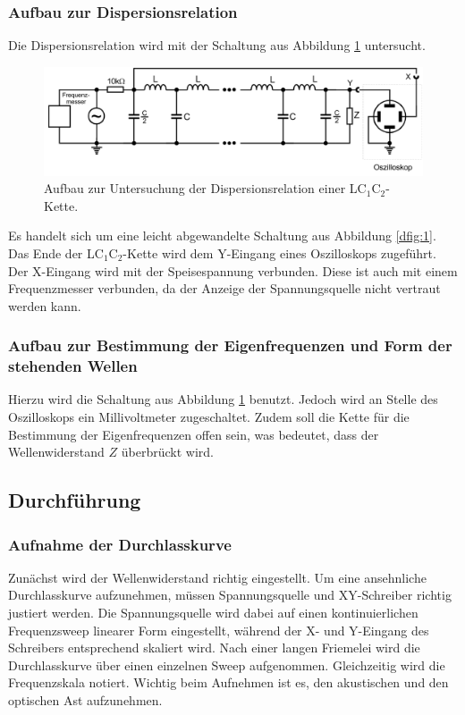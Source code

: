 \subsubsection{Aufbau zur Dispersionsrelation}
Die Dispersionsrelation wird mit der Schaltung aus Abbildung \ref{dfig:2} untersucht.

\begin{figure}[H]
  \centering
  \includegraphics{dispersion.png}
  \caption{Aufbau zur Untersuchung der Dispersionsrelation einer LC$_1$C$_2$-Kette.}
  \label{dfig:2}
\end{figure}

Es handelt sich um eine leicht abgewandelte Schaltung aus Abbildung \ref{dfig:1}.
Das Ende der LC$_1$C$_2$-Kette wird dem Y-Eingang eines Oszilloskops zugeführt.
Der X-Eingang wird mit der Speisespannung verbunden.
Diese ist auch mit einem Frequenzmesser verbunden, da der Anzeige der Spannungsquelle nicht vertraut werden kann.

\subsubsection{Aufbau zur Bestimmung der Eigenfrequenzen und Form der stehenden Wellen}
Hierzu wird die Schaltung aus Abbildung \ref{dfig:2} benutzt.
Jedoch wird an Stelle des Oszilloskops ein Millivoltmeter zugeschaltet.
Zudem soll die Kette für die Bestimmung der Eigenfrequenzen offen sein, was bedeutet, dass der Wellenwiderstand $Z$ überbrückt wird.

\subsection{Durchführung}
\subsubsection{Aufnahme der Durchlasskurve}
Zunächst wird der Wellenwiderstand richtig eingestellt.
Um eine ansehnliche Durchlasskurve aufzunehmen, müssen Spannungsquelle und XY-Schreiber richtig justiert werden.
Die Spannungsquelle wird dabei auf einen kontinuierlichen Frequenzsweep linearer Form eingestellt, während der X- und Y-Eingang des Schreibers entsprechend skaliert wird.
Nach einer langen Friemelei wird die Durchlasskurve über einen einzelnen Sweep aufgenommen.
Gleichzeitig wird die Frequenzskala notiert.
Wichtig beim Aufnehmen ist es, den akustischen und den optischen Ast aufzunehmen.


